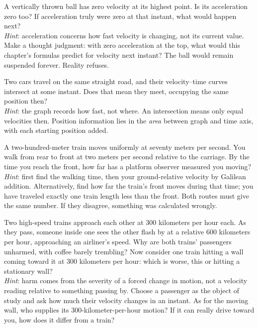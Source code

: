 \begin{puzzles}
\item A vertically thrown ball has zero velocity at its highest point. Is its acceleration zero too? If acceleration truly were zero at that instant, what would happen next?\\
\emph{Hint}: acceleration concerns how fast velocity is changing, not its current value. Make a thought judgment: with zero acceleration at the top, what would this chapter's formulas predict for velocity next instant? The ball would remain suspended forever. Reality refuses.
\item Two cars travel on the same straight road, and their velocity--time curves intersect at some instant. Does that mean they meet, occupying the same position then?\\
\emph{Hint}: the graph records how fast, not where. An intersection means only equal velocities then. Position information lies in the \emph{area} between graph and time axis, with each starting position added.
\item A two-hundred-meter train moves uniformly at seventy meters per second. You walk from rear to front at two meters per second relative to the carriage. By the time you reach the front, how far has a platform observer measured you moving?\\
\emph{Hint}: first find the walking time, then your ground-relative velocity by Galilean addition. Alternatively, find how far the train's front moves during that time; you have traveled exactly one train length less than the front. Both routes must give the same number. If they disagree, something was calculated wrongly.
\item Two high-speed trains approach each other at 300 kilometers per hour each. As they pass, someone inside one sees the other flash by at a relative 600 kilometers per hour, approaching an airliner's speed. Why are both trains' passengers unharmed, with coffee barely trembling? Now consider one train hitting a wall coming toward it at 300 kilometers per hour: which is worse, this or hitting a stationary wall?\\
\emph{Hint}: harm comes from the severity of a forced change in motion, not a velocity reading relative to something passing by. Choose a passenger as the object of study and ask how much their velocity changes in an instant. As for the moving wall, who supplies its 300-kilometer-per-hour motion? If it can really drive toward you, how does it differ from a train?
\end{puzzles}

